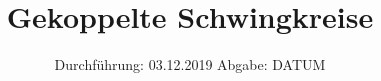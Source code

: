 
\usepackage{physics}
\subject{355}
\title{Gekoppelte Schwingkreise}
\date{%
  Durchführung: 03.12.2019
  \hspace{3em}
  Abgabe: DATUM
}




\maketitle
\thispagestyle{empty}
\tableofcontents
\newpage
\nocite{V355}






\printbibliography{}


